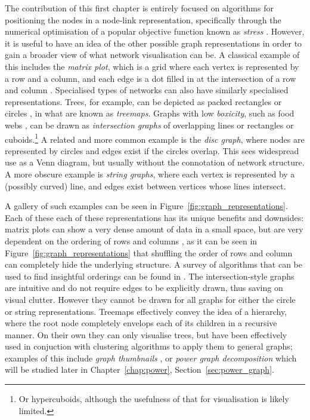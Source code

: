 The contribution of this first chapter is entirely focused on algorithms for positioning the nodes in a node-link representation, specifically through the numerical optimisation of a popular objective function known as \emph{stress} \citep{Zheng2019Stochastic}.
However, it is useful to have an idea of the other possible graph representations in order to gain a broader view of what network visualisation can be. A classical example of this includes the \emph{matrix plot}, which is a grid where each vertex is represented by a row and a column, and each edge is a dot filled in at the intersection of a row and column \citep{Liiv2010}.
Specialised types of networks can also have similarly specialised representations. Trees, for example, can be depicted as packed rectangles \citep{Johnson1991} or circles \citep{Wang2006}, in what are known as \emph{treemaps}.
Graphs with low \emph{boxicity}, such as food webs \citep{Eklof2013}, can be drawn as \emph{intersection graphs} of overlapping lines or rectangles or cuboids.\footnote{Or hypercuboids, although the usefulness of that for visualisation is likely limited.}
A related and more common example is the \emph{disc graph}, where nodes are represented by circles and edges exist if the circles overlap. This sees widespread use as a Venn diagram, but usually without the connotation of network structure.
A more obscure example is \emph{string graphs}, where each vertex is represented by a (possibly curved) line, and edges exist between vertices whose lines intersect.

A gallery of such examples can be seen in Figure~\ref{fig:graph_representations}.
Each of these each of these representations has its unique benefits and downsides: matrix plots can show a very dense amount of data in a small space, but are very dependent on the ordering of rows and columns \citep{Liiv2010}, as it can be seen in Figure~\ref{fig:graph_representations} that shuffling the order of rows and column can completely hide the underlying structure. A survey of algorithms that can be used to find insightful orderings can be found in \citet{Bach2016}.
The intersection-style graphs are intuitive and do not require edges to be explicitly drawn, thus saving on visual clutter. However they cannot be drawn for all graphs for either the circle \citep{McDiarmid2014} or string \citep{Schaefer2003} representations.
Treemaps effectively convey the idea of a hierarchy, where the root node completely envelops each of its children in a recursive manner. On their own they can only visualise trees, but have been effectively used in conjuction with clustering algorithms to apply them to general graphs; examples of this include \emph{graph thumbnails} \citep{Yoghourdjian2018}, or \emph{power graph decomposition} \citep{Dwyer2014} which will be studied later in Chapter~\ref{chap:power}, Section~\ref{sec:power_graph}.
  

